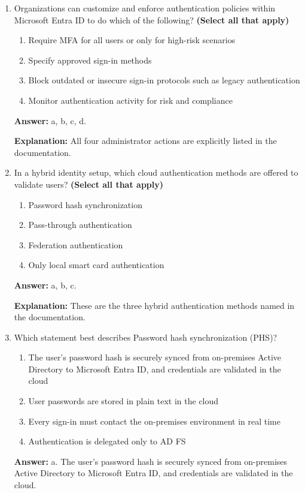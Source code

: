 \documentclass[10pt]{article}
\begin{document}
\begin{enumerate}[leftmargin=*]
\textbf{Explanation:} These are the exact outcomes described in the Identity Protection section.

\item Organizations can customize and enforce authentication policies within Microsoft Entra ID to do which of the following? \textbf{(Select all that apply)}
\begin{enumerate}[label=\alph*., leftmargin=1.5em]
\item Require MFA for all users or only for high-risk scenarios
\item Specify approved sign-in methods
\item Block outdated or insecure sign-in protocols such as legacy authentication
\item Monitor authentication activity for risk and compliance
\end{enumerate}
\textbf{Answer:} a, b, c, d.

\textbf{Explanation:} All four administrator actions are explicitly listed in the documentation.

\item In a hybrid identity setup, which cloud authentication methods are offered to validate users? \textbf{(Select all that apply)}
\begin{enumerate}[label=\alph*., leftmargin=1.5em]
\item Password hash synchronization
\item Pass-through authentication
\item Federation authentication
\item Only local smart card authentication
\end{enumerate}
\textbf{Answer:} a, b, c.

\textbf{Explanation:} These are the three hybrid authentication methods named in the documentation.

\item Which statement best describes Password hash synchronization (PHS)?
\begin{enumerate}[label=\alph*., leftmargin=1.5em]
\item The user’s password hash is securely synced from on-premises Active Directory to Microsoft Entra ID, and credentials are validated in the cloud
\item User passwords are stored in plain text in the cloud
\item Every sign-in must contact the on-premises environment in real time
\item Authentication is delegated only to AD FS
\end{enumerate}
\textbf{Answer:} a. The user’s password hash is securely synced from on-premises Active Directory to Microsoft Entra ID, and credentials are validated in the cloud.


\end{enumerate}
\end{document}
